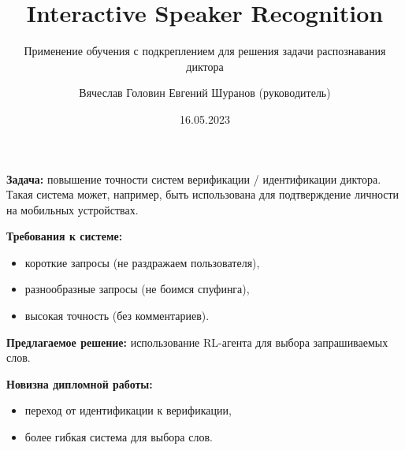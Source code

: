\documentclass[aspectratio=169]{beamer}
\title{Interactive Speaker Recognition}
\subtitle{Применение обучения с подкреплением для решения задачи распознавания
          диктора}
\author[В.С.~Головин]{Вячеслав Головин \texorpdfstring{\newline}{, }
    {\small Евгений Шуранов (руководитель)}}
\institute[ВШЭ]{Huawei CBG AI и ФКН ВШЭ СПб}
\date{16.05.2023}
\begin{document}
\frame{\titlepage}

\begin{frame}{}
    \textbf{Задача:} повышение точности систем верификации / идентификации
    диктора. Такая система может, например, быть использована для подтверждение
    личности на мобильных устройствах.\vspace{1em}

    \textbf{Требования к системе:}
    \begin{itemize}
        \item короткие запросы (не раздражаем пользователя),
        \item разнообразные запросы (не боимся спуфинга),
        \item высокая точность (без комментариев).
    \end{itemize}\vspace{1em}

    \textbf{Предлагаемое решение:} использование RL-агента для выбора
    запрашиваемых слов.\vspace{1em}

    \textbf{Новизна дипломной работы:}
    \begin{itemize}
        \item переход от идентификации к верификации,
        \item более гибкая система для выбора слов.
    \end{itemize}
\end{frame}
\end{document}
